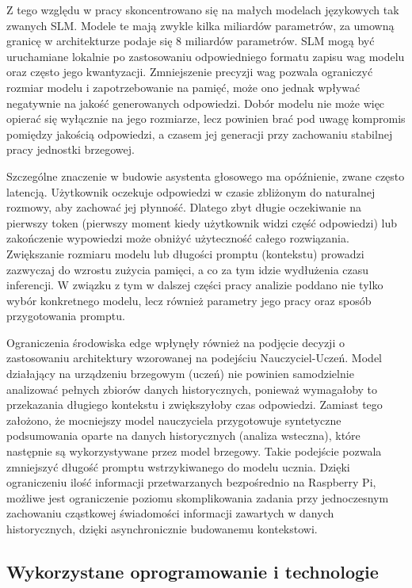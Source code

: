 Z tego względu w pracy skoncentrowano się na małych modelach językowych tak zwanych SLM. Modele te mają zwykle kilka miliardów parametrów, za umowną granicę w architekturze podaje się 8 miliardów parametrów. SLM mogą być uruchamiane lokalnie po zastosowaniu odpowiedniego formatu zapisu wag modelu oraz często jego kwantyzacji. Zmniejszenie precyzji wag pozwala ograniczyć rozmiar modelu i zapotrzebowanie na pamięć, może ono jednak wpływać negatywnie na jakość generowanych odpowiedzi. Dobór modelu nie może więc opierać się wyłącznie na jego rozmiarze, lecz powinien brać pod uwagę kompromis pomiędzy jakością odpowiedzi,  a czasem jej generacji przy zachowaniu stabilnej pracy jednostki brzegowej.

Szczególne znaczenie w budowie asystenta głosowego ma opóźnienie, zwane często latencją. Użytkownik oczekuje odpowiedzi w czasie zbliżonym do naturalnej rozmowy, aby zachować jej płynność. Dlatego zbyt długie oczekiwanie na pierwszy token (pierwszy moment kiedy użytkownik widzi część odpowiedzi) lub zakończenie wypowiedzi może obniżyć użyteczność całego rozwiązania. Zwiększanie rozmiaru modelu lub długości promptu (kontekstu) prowadzi zazwyczaj do wzrostu zużycia pamięci, a co za tym idzie wydłużenia czasu inferencji. W związku z tym w dalszej części pracy analizie poddano nie tylko wybór konkretnego modelu, lecz również parametry jego pracy oraz sposób przygotowania promptu.

Ograniczenia środowiska edge wpłynęły również na podjęcie decyzji o zastosowaniu architektury wzorowanej na podejściu Nauczyciel-Uczeń. Model działający na urządzeniu brzegowym (uczeń) nie powinien samodzielnie analizować pełnych zbiorów danych historycznych, ponieważ wymagałoby to przekazania długiego kontekstu i zwiększyłoby czas odpowiedzi. Zamiast tego założono, że mocniejszy model nauczyciela przygotowuje syntetyczne podsumowania oparte na danych historycznych (analiza wsteczna), które następnie są wykorzystywane przez model brzegowy. Takie podejście pozwala zmniejszyć długość promptu wstrzykiwanego do modelu ucznia. Dzięki ograniczeniu ilość informacji przetwarzanych bezpośrednio na Raspberry Pi, możliwe jest ograniczenie poziomu skomplikowania zadania przy jednoczesnym zachowaniu cząstkowej świadomości informacji zawartych w danych historycznych, dzięki asynchronicznie budowanemu kontekstowi.

\subsection{Wykorzystane oprogramowanie i technologie}

